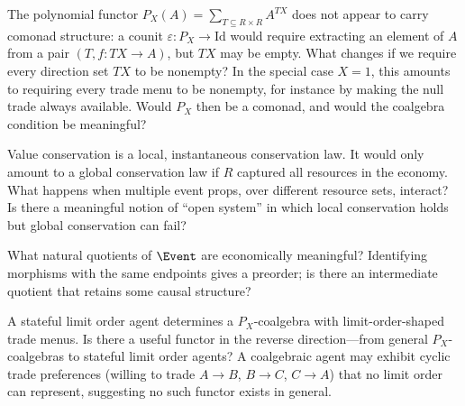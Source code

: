 

\begin{question}
The polynomial functor $P_X(A) = \sum_{T \subseteq R \times R} A^{T X}$ does not appear to carry comonad structure: a counit $\varepsilon\colon P_X \to \mathrm{Id}$ would require extracting an element of $A$ from a pair $(T, f\colon T X \to A)$, but $T X$ may be empty.  What changes if we require every direction set $T X$ to be nonempty?  In the special case $X=1$, this amounts to requiring every trade menu to be nonempty, for instance by making the null trade always available.  Would $P_X$ then be a comonad, and would the coalgebra condition be meaningful?
\end{question}

\begin{question}
Value conservation is a local, instantaneous conservation law.  It would only amount to a global conservation law if $R$ captured all resources in the economy.  What happens when multiple event props, over different resource sets, interact?  Is there a meaningful notion of ``open system'' in which local conservation holds but global conservation can fail?
\end{question}

\begin{question}
What natural quotients of $\Event$ are economically meaningful?  Identifying morphisms with the same endpoints gives a preorder; is there an intermediate quotient that retains some causal structure?
\end{question}

\begin{question}
A stateful limit order agent determines a $P_X$-coalgebra with limit-order-shaped trade menus.  Is there a useful functor in the reverse direction---from general $P_X$-coalgebras to stateful limit order agents?  A coalgebraic agent may exhibit cyclic trade preferences (willing to trade $A \to B$, $B \to C$, $C \to A$) that no limit order can represent, suggesting no such functor exists in general.
\end{question}



